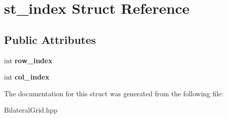 \hypertarget{structst__index}{}\section{st\+\_\+index Struct Reference}
\label{structst__index}
\subsection*{Public Attributes}
\begin{DoxyCompactItemize}
\item 
int {\bfseries row\+\_\+index}\hypertarget{structst__index_a927d6a3d69fff186234d558e718610ee}{}\label{structst__index_a927d6a3d69fff186234d558e718610ee}

\item 
int {\bfseries col\+\_\+index}\hypertarget{structst__index_a4e26303cd6c2ea83664bf6052aa465d8}{}\label{structst__index_a4e26303cd6c2ea83664bf6052aa465d8}

\end{DoxyCompactItemize}


The documentation for this struct was generated from the following file\+:\begin{DoxyCompactItemize}
\item 
Bilateral\+Grid.\+hpp\end{DoxyCompactItemize}
